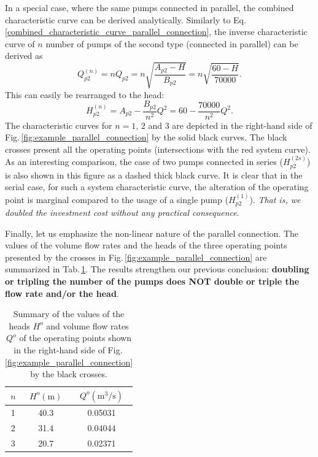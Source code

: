 In a special case, where the same pumps connected in parallel, the combined characteristic curve can be derived analytically. Similarly to Eq.\,\eqref{combined_characteristic_curve_parallel_connection}, the inverse characteristic curve of $n$ number of pumps of the second type (connected in parallel) can be derived as
%
\begin{equation}
Q_{p2}^{(n)} = n Q_{p2} = n \sqrt{ \frac{A_{p2}-H}{B_{p2}} } = n \sqrt{ \frac{60-H}{70000} }.
\end{equation}
%
This can easily be rearranged to the head:
%
\begin{equation}
H_{p2}^{(n)} = A_{p2} - \frac{B_{p2}}{n^2} Q^2  = 60 - \frac{70000}{n^2} Q^2.
\end{equation}
%
The characteristic curves for $n=1$, $2$ and $3$ are depicted in the right-hand side of Fig.\,\ref{fig:example_parallel_connection} by the solid black curves. The black crosses present all the operating points (intersections with the red system curve). As an interesting comparison, the case of two pumps connected in series ($H_{p2}^{(2s)}$) is also shown in this figure as a dashed thick black curve. It is clear that in the serial case, for such a system characteristic curve, the alteration of the operating point is marginal compared to the usage of a single pump ($H_{p2}^{(1)}$). \textit{That is, we doubled the investment cost without any practical consequence}.

Finally, let us emphasize the non-linear nature of the parallel connection. The values of the volume flow rates and the heads of the three operating points presented by the crosses in Fig.\,\ref{fig:example_parallel_connection} are summarized in Tab.\,\ref{tab:summary_oprating_points_parallel_connection}. The results strengthen our previous conclusion: \textbf{doubling or tripling the number of the pumps does NOT double or triple the flow rate and/or the head}.

\begin{table}[ht!]
\caption{Summary of the values of the heads $H^o$ and volume flow rates $Q^o$ of the operating points shown in the right-hand side of Fig.\,\ref{fig:example_parallel_connection} by the black crosses.}
	\label{tab:summary_oprating_points_parallel_connection}
	\centering
		\begin{tabular}{c|cc}
		 $n$ & $H^o (\mathrm{m})$ & $Q^o (\mathrm{m^3/s})$ \\ \hline \hline
		 1   & 40.3               & 0.05031 \\
		 2   & 31.4               & 0.04044 \\
		 3   & 20.7               & 0.02371 \\
		\end{tabular}
\end{table}

